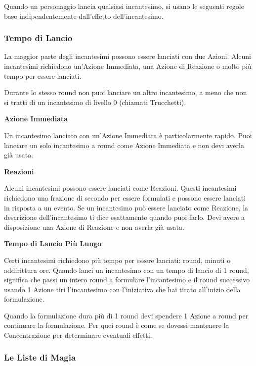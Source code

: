 \begin{multicols}{2}
Quando un personaggio lancia qualsiasi incantesimo, si usano le seguenti regole base indipendentemente dall'effetto dell'incantesimo.

\subsubsection{Tempo di Lancio}\label{magietempodilancio}\hypertarget{magietempodilancio}{}

La maggior parte degli incantesimi possono essere lanciati con due Azioni. Alcuni incantesimi richiedono un'Azione Immediata, una Azione di Reazione o molto più tempo per essere lanciati.

Durante lo stesso round non puoi lanciare un altro incantesimo, a meno che non si tratti di un incantesimo di livello 0 (chiamati Trucchetti).

\textbf{Azione Immediata}

Un incantesimo lanciato con un'Azione Immediata è particolarmente rapido. Puoi lanciare un solo incantesimo a round come Azione Immediata e non devi averla già usata.

\textbf{Reazioni}

Alcuni incantesimi possono essere lanciati come Reazioni. Questi incantesimi richiedono una frazione di secondo per essere formulati e possono essere lanciati in risposta a un evento. Se un incantesimo può essere lanciato come Reazione, la descrizione dell'incantesimo ti dice esattamente quando puoi farlo. Devi avere a disposizione una Azione di Reazione e non averla già usata.

\textbf{Tempo di Lancio Più Lungo}

Certi incantesimi richiedono più tempo per essere lanciati: round, minuti o addirittura ore. 
Quando lanci un incantesimo con un tempo di lancio di 1 round, significa che passi un intero round a formulare l'incantesimo e il round successivo usando 1 Azione tiri l'incantesimo con l'iniziativa che hai tirato all'inizio della formulazione.

Quando la formulazione dura più di 1 round devi spendere 1 Azione a round per continuare la formulazione. Per quei round è come se dovessi mantenere la Concentrazione per determinare eventuali effetti.


\subsubsection{Le Liste di Magia}\hypertarget{lescuoledimagia}{} \label{magielistadimagia}



\end{multicols}

